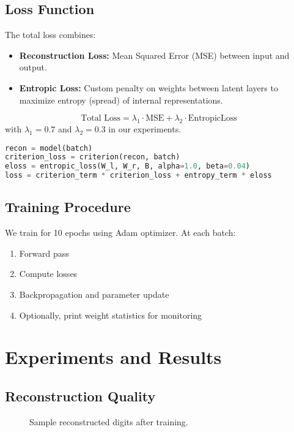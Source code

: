 \documentclass[12pt]{article}
\begin{document}
\subsection{Loss Function}
The total loss combines:
\begin{itemize}
    \item \textbf{Reconstruction Loss:} Mean Squared Error (MSE) between input and output.
    \item \textbf{Entropic Loss:} Custom penalty on weights between latent layers to maximize entropy (spread) of internal representations.
\end{itemize}
\[
\text{Total Loss} = \lambda_1 \cdot \text{MSE} + \lambda_2 \cdot \text{EntropicLoss}
\]
with $\lambda_1 = 0.7$ and $\lambda_2 = 0.3$ in our experiments.

\begin{lstlisting}[language=Python,caption={Loss Computation}]
recon = model(batch)
criterion_loss = criterion(recon, batch)
eloss = entropic_loss(W_l, W_r, B, alpha=1.0, beta=0.04)
loss = criterion_term * criterion_loss + entropy_term * eloss
\end{lstlisting}

\subsection{Training Procedure}
We train for 10 epochs using Adam optimizer. At each batch:
\begin{enumerate}
    \item Forward pass
    \item Compute losses
    \item Backpropagation and parameter update
    \item Optionally, print weight statistics for monitoring
\end{enumerate}

\section{Experiments and Results}

\subsection{Reconstruction Quality}
\begin{figure}[h!]
    \centering
    \caption{Sample reconstructed digits after training.}
\end{figure}
\end{document}
